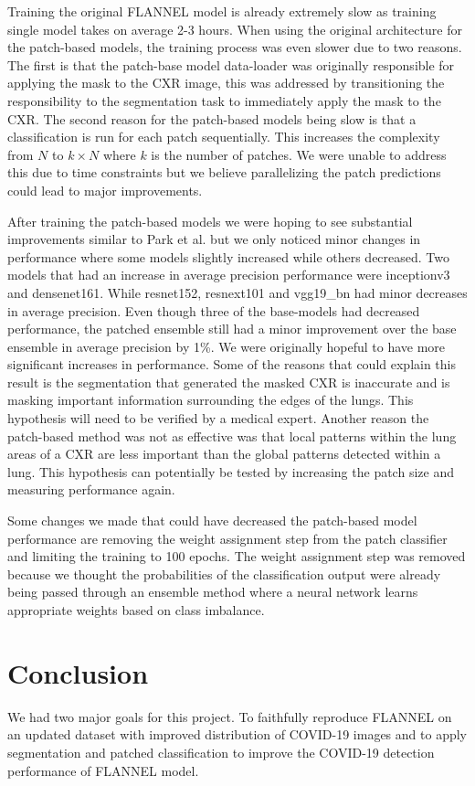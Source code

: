 \documentclass{sigkddExp}
\begin{document}
Training the original FLANNEL model is already extremely slow as training single
model takes on average 2-3 hours. When using the original architecture for the
patch-based models, the training process was even slower due to two reasons. The
first is that the patch-base model data-loader was originally responsible for
applying the mask to the CXR image, this was addressed by transitioning the
responsibility to the segmentation task to immediately apply the mask to the
CXR. The second reason for the patch-based models being slow is that a
classification is run for each patch sequentially. This increases the complexity
from $N$ to $k\times N$ where $k$ is the number of patches. We were unable to
address this due to time constraints but we believe parallelizing the patch
predictions could lead to major improvements.

After training the patch-based models we were hoping to see substantial
improvements similar to Park et al. but we only noticed minor changes in
performance where some models slightly increased while others decreased. Two
models that had an increase in average precision performance were inceptionv3
and densenet161. While resnet152, resnext101 and vgg19\_bn had minor decreases
in average precision. Even though three of the base-models had decreased
performance, the patched ensemble still had a minor improvement over the base
ensemble in average precision by 1\%. We were originally hopeful to have more
significant increases in performance. Some of the reasons that could explain
this result is the segmentation that generated the masked CXR is inaccurate and
is masking important information surrounding the edges of the lungs. This
hypothesis will need to be verified by a medical expert. Another reason the
patch-based method was not as effective was that local patterns within the lung
areas of a CXR are less important than the global patterns detected within a
lung. This hypothesis can potentially be tested by increasing the patch size and
measuring performance again.

Some changes we made that could have decreased the patch-based model performance
are removing the weight assignment step from the patch classifier and limiting
the training to 100 epochs. The weight assignment step was removed because we
thought the probabilities of the classification output were already being passed
through an ensemble method where a neural network learns appropriate weights
based on class imbalance.


\section{Conclusion}
We had two major goals for this project. To faithfully reproduce FLANNEL on an
updated dataset with improved distribution of COVID-19 images and to apply
segmentation and patched classification to improve the COVID-19 detection
performance of FLANNEL model.
\end{document}
